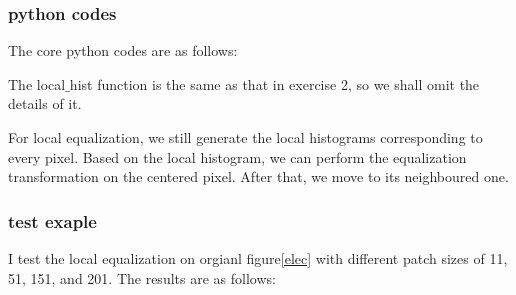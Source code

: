 \documentclass{article}
\begin{document}
\subsubsection{python codes}
The core python codes are as follows:
 

The local$\_$hist function is the same as that in exercise 2, 
so we shall omit the details of it.

For local equalization, we still generate the local histograms corresponding to every pixel.
Based on the local histogram, we can perform the equalization transformation 
on the centered pixel. After that, we move to its neighboured one.
\subsubsection{test exaple}
I test the local equalization on orgianl figure\ref{elec} with different patch sizes of 
11, 51, 151, and 201. The results are as follows:
\end{document}

